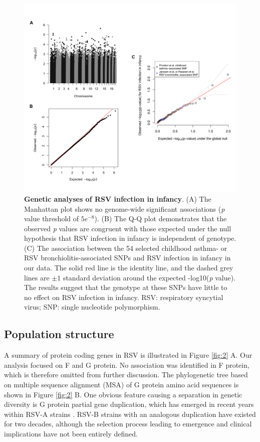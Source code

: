 \documentclass{article} %
\begin{document}
\begin{figure}[ht] \hspace{-0.5cm}
\begin{center}
    \includegraphics[scale=0.07]{host_genetics}
\end{center} 
	\caption{\textbf{Genetic analyses of RSV infection in infancy}.
		(A) The Manhattan plot shows no genome-wide significant associations (\textit{p} value threshold of $5e^{-8}$).
		(B) The Q-Q plot demonstrates that the observed \textit{p} values are congruent with those expected under the null hypothesis that RSV infection in infancy is independent of genotype. 
		(C) The association between the 54 selected childhood asthma- or RSV bronchiolitis-associated SNPs and RSV infection in infancy in our data. 
		The solid red line is the identity line, and the dashed grey lines are $\pm 1$ standard deviation around the expected -log10(\textit{p} value). 
		The results suggest that the genotype at these SNPs have little to no effect on RSV infection in infancy. 
		RSV: respiratory syncytial virus; SNP: single nucleotide polymorphism.
	}
	\label{fig:host_genetics} 
\end{figure}
\clearpage

\subsection{Population structure}
A summary of protein coding genes in RSV is illustrated in
Figure \ref{fig:2} A.
Our analysis focused on F and G protein.
No association was identified in F protein, which is therefore omitted from further discussion.
The phylogenetic tree based on multiple sequence alignment (MSA) of G protein amino acid sequences is shown in 
Figure \ref{fig:2} B.
One obvious feature causing a separation in genetic diversity is G protein partial gene duplication, 
which has emerged in recent years within RSV-A strains 
\citep{eshaghi2012genetic}.
RSV-B strains with an analogous duplication have existed for two decades, 
although the selection process leading to emergence and clinical implications have not been entirely defined.
\end{document}

